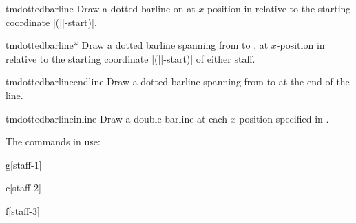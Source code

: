 \documentclass[11pt,a4paper]{ltxdoc}
\begin{document}
\begin{docCommand}{tmdottedbarline}{}
  Draw a dotted barline on  at $x$-position  in 
  relative to the starting coordinate |(||-start)|.
\end{docCommand}
\begin{docCommand}{tmdottedbarline*}{}
  Draw a dotted barline spanning from  to 
  , at $x$-position  in relative to 
  the starting coordinate |(||-start)| of either staff.
\end{docCommand}
\begin{docCommand}{tmdottedbarlineendline}{}
  Draw a dotted barline spanning from  to 
   at the end of the line.
\end{docCommand}
\begin{docCommand}{tmdottedbarlineinline}{}
  Draw a double barline at each $x$-position specified in .
\end{docCommand}
The commands in use:
\begin{dispExample}
\begin{tmmultiplestaves}[0pt]%
  \begin{tmstaff}{g}[staff-1]
  \end{tmstaff}%
  \begin{tmstaff}{c}[staff-2]
  \end{tmstaff}%
  \begin{tmstaff}{f}[staff-3]
  \end{tmstaff}%
\end{tmmultiplestaves}
\end{dispExample}
\end{document}
